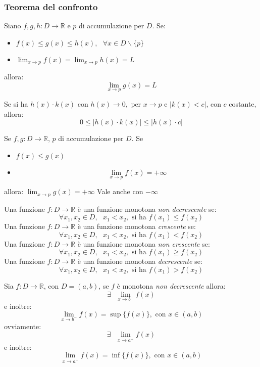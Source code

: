 \documentclass[a4paper,12pt, oneside]{book}
\begin{document}
\subsubsection{Teorema del confronto}
\begin{teorema}
Siano $f,g,h:D\rightarrow \mathbb{R}$ e $p$ di accumulazione per $D$. Se:
\begin{itemize}
\item $f(x)\leq g(x)\leq h(x),\mbox{ } \forall x\in D \backslash \{p\}$
\item $\lim_{x\rightarrow p} f(x) =\lim_{x\rightarrow p} h(x)=L$
\end{itemize}
allora:
 $$\lim_{x\rightarrow p} g(x)=L$$
\end{teorema}
\begin{osservazione}
Se si ha $h(x)\cdot k(x)$ con $h(x)\rightarrow 0, \mbox{ per } x\rightarrow p$ e $|k(x)<c|$, con $c$ costante, allora:
$$0\leq |h(x)\cdot k(x)|\leq |h(x)\cdot c|$$ 
\end{osservazione}
\begin{corollario}
Se $f,g:D\rightarrow \mathbb{R}$, $p$ di accumulazione per $D$. Se
\begin{itemize}
\item $f(x)\leq g(x)$
\item  $$\lim_{x\rightarrow p} f(x) = +\infty$$
\end{itemize}
allora:
$\lim_{x\rightarrow p} g(x) =+\infty$
Vale anche con $-\infty$
\end{corollario}
\begin{nota}
\begin{shaded}
Una funzione $f:D\rightarrow \mathbb{R}$ è una funzione monotona \textit{non decrescente} se:
$$\forall x_1,x_2\in D, \mbox{ } x_1<x_2, \mbox{ si ha } f(x_1)\leq f(x_2)$$
Una funzione $f:D\rightarrow \mathbb{R}$ è una funzione monotona \textit{crescente} se:
$$\forall x_1,x_2\in D, \mbox{ } x_1<x_2, \mbox{ si ha } f(x_1)< f(x_2)$$
Una funzione $f:D\rightarrow \mathbb{R}$ è una funzione monotona \textit{non crescente} se:
$$\forall x_1,x_2\in D, \mbox{ } x_1<x_2, \mbox{ si ha } f(x_1)\geq f(x_2)$$
Una funzione $f:D\rightarrow \mathbb{R}$ è una funzione monotona \textit{decrescente} se:
$$\forall x_1,x_2\in D, \mbox{ } x_1<x_2, \mbox{ si ha } f(x_1)> f(x_2)$$
\end{shaded}
\end{nota}
\begin{teorema}
Sia $f:D\rightarrow \mathbb{R}$, con $D=(a,b)$, se $f$ è monotona \textit{non decrescente} allora:
$$\exists \mbox{ } \lim_{x\rightarrow b^{-}} f(x)$$
e inoltre:
$$ \lim_{x\rightarrow b^{-}} f(x)=\sup\{f(x)\}, \mbox{ con } x\in (a,b)$$
ovviamente:
$$\exists \mbox{ } \lim_{x\rightarrow a^{+}} f(x)$$
e inoltre:
$$ \lim_{x\rightarrow a^{+}} f(x)=\inf\{f(x)\}, \mbox{ con } x\in (a,b)$$
\end{teorema}
\end{document}
